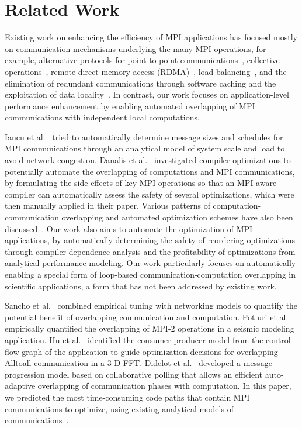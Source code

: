 \section{Related Work}
\label{sec-related}

Existing work on enhancing the efficiency of MPI applications has 
focused mostly on communication mechanisms underlying the many 
MPI operations, for example, alternative protocols for point-to-point
communications~\cite{brightwell:eurompi03,denis:eurompi11}, collective
operations~\cite{traff:eurompi14:ocd,traff:eurompi14:mcd,graham:eurompi08,mittal:ppopp12},
remote direct memory access
(RDMA)~\cite{liu:ics03,woodall:eurompi06,hatanaka:eurompi13}, load
balancing~\cite{nian:niss09,kale:eurompi14}, and the
elimination of redundant communications through software caching and
the exploitation of data
locality~\cite{buntinas:icpp09,isujita:eurompi14,ozog:ics13}.  In
contrast, our work focuses on application-level performance
enhancement by enabling automated overlapping of MPI communications
with independent local computations.

Iancu et al.~\cite{iancu:ppopp07} tried to automatically determine
message sizes and schedules for MPI communications through an
analytical model of system scale and load to avoid network congestion.
Danalis et al.~\cite{danalis:ics09} investigated compiler
optimizations to potentially automate the overlapping of 
computations and MPI communications, by formulating the side effects of key MPI operations so that
an MPI-aware compiler can automatically assess the safety of several
optimizations, which were then manually applied in their paper.
Various patterns of computation-communication overlapping and
automated optimization schemes have also been
discussed~\cite{danalis:sc05,fishgold:ipdps06}.  Our work also aims to automate the optimization
of MPI applications, by automatically determining the safety of reordering optimizations through compiler 
dependence analysis and the profitability of optimizations from 
analytical performance modeling. Our work particularly focuses on automatically enabling 
a special form of loop-based
communication-computation overlapping in scientific applications, a form that has not been addressed
by existing work. 

Sancho et al.~\cite{sancho:sc06} combined empirical tuning with
networking models to quantify the potential benefit of overlapping
communication and computation.
Potluri et al.~\cite{potluri:ics10} empirically quantified the
overlapping of MPI-2 operations in a seismic modeling application.  Hu
et al.~\cite{hu:npc08,song:ppopp14} identified the consumer-producer
model from the control flow graph of the application to guide
optimization decisions for overlapping Alltoall communication in a 3-D
FFT.  Didelot et al.~\cite{didelot:imc14,didelot:eurompi12} developed
a message progression model based on collaborative polling that allows
an efficient auto-adaptive overlapping of communication phases with
computation.  In this paper, we predicted the most time-consuming
code paths that contain MPI communications to
optimize, using existing analytical models of
communications~\cite{loggp}.

